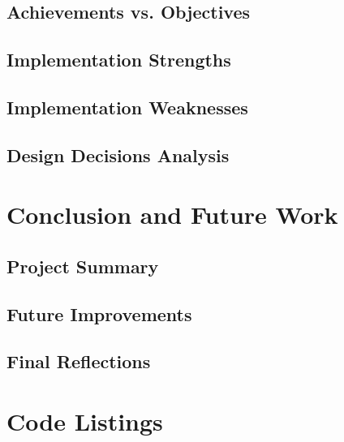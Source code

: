 \documentclass[12pt,a4paper]{report}
\begin{document}
\section{Achievements vs. Objectives}

\section{Implementation Strengths}

\section{Implementation Weaknesses}

\section{Design Decisions Analysis}

\chapter{Conclusion and Future Work}
\section{Project Summary}

\section{Future Improvements}

\section{Final Reflections}

\appendix
\chapter{Code Listings}
\end{document}
